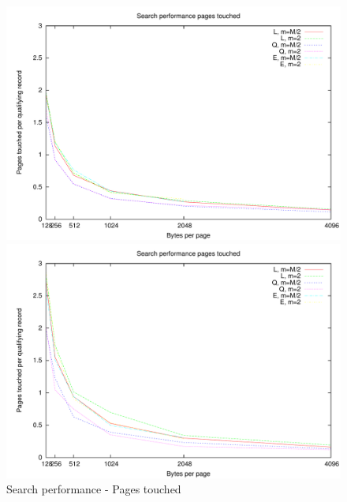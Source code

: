 \begin{figure}
\centering
\begin{minipage}{0.49\textwidth}
\centering
\includegraphics[width=\textwidth]{fig/random/figure-4-4.pdf}
\end{minipage}
\begin{minipage}{0.49\textwidth}
\centering
\includegraphics[width=\textwidth]{fig/usppp/figure-4-4.pdf}
\end{minipage}
\caption{Search performance - Pages touched}
\label{fig:4.4}
\end{figure}

